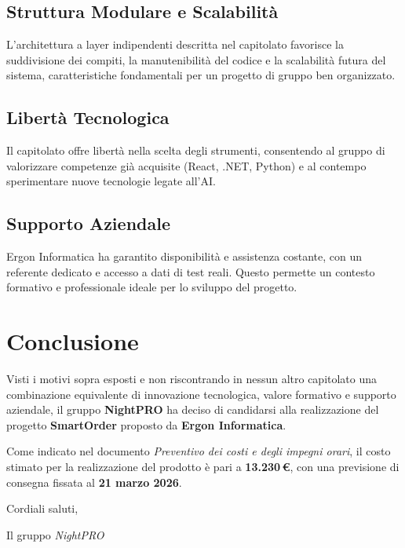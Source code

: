 \documentclass[a4paper, 11pt, oneside]{scrartcl} %
\begin{document}
\subsection*{Struttura Modulare e Scalabilità}
L’architettura a layer indipendenti descritta nel capitolato favorisce la suddivisione dei compiti, la manutenibilità del codice e la scalabilità futura del sistema, caratteristiche fondamentali per un progetto di gruppo ben organizzato.

\subsection*{Libertà Tecnologica}
Il capitolato offre libertà nella scelta degli strumenti, consentendo al gruppo di valorizzare competenze già acquisite (React, .NET, Python) e al contempo sperimentare nuove tecnologie legate all’AI.

\subsection*{Supporto Aziendale}
Ergon Informatica ha garantito disponibilità e assistenza costante, con un referente dedicato e accesso a dati di test reali. Questo permette un contesto formativo e professionale ideale per lo sviluppo del progetto.

\section{Conclusione}
Visti i motivi sopra esposti e non riscontrando in nessun altro capitolato una combinazione equivalente di innovazione tecnologica, valore formativo e supporto aziendale, il gruppo \textbf{NightPRO} ha deciso di candidarsi alla realizzazione del progetto \textbf{SmartOrder} proposto da \textbf{Ergon Informatica}.  

Come indicato nel documento \textit{Preventivo dei costi e degli impegni orari}, il costo stimato per la realizzazione del prodotto è pari a \textbf{13.230\,€}, con una previsione di consegna fissata al \textbf{21 marzo 2026}.

\vspace{0.5cm}

Cordiali saluti,
\begin{flushright}
    Il gruppo \emph{NightPRO}
\end{flushright}
\end{document}
